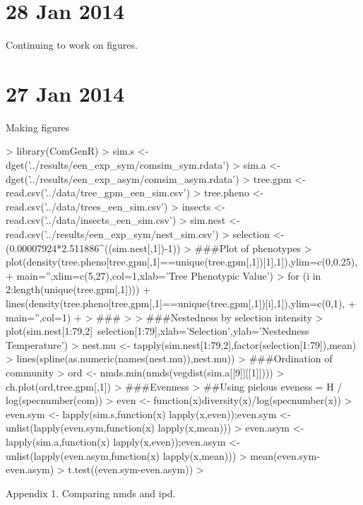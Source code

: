 \documentclass[12pt]{article}
\begin{document}
\section{28 Jan 2014}

Continuing to work on figures.

\section{27 Jan 2014}

Making figures

\begin{Schunk}
\begin{Sinput}
> library(ComGenR)  
> sim.s <- dget('../results/een_exp_sym/comsim_sym.rdata')
> sim.a <- dget('../results/een_exp_asym/comsim_asym.rdata')
> tree.gpm <- read.csv('../data/tree_gpm_een_sim.csv')
> tree.pheno <- read.csv('../data/trees_een_sim.csv')
> insects <- read.csv('../data/insects_een_sim.csv')
> sim.nest <- read.csv('../results/een_exp_sym/nest_sim.csv')
> selection <- (0.00007924*2.511886^((sim.nest[,1])-1))
> ###Plot of phenotypes
> plot(density(tree.pheno[tree.gpm[,1]==unique(tree.gpm[,1])[1],1]),ylim=c(0,0.25),
+      main='',xlim=c(5,27),col=1,xlab='Tree Phenotypic Value')
> for (i in 2:length(unique(tree.gpm[,1]))){
+   lines(density(tree.pheno[tree.gpm[,1]==unique(tree.gpm[,1])[i],1]),ylim=c(0,1),
+         main='',col=1)
+ }
> ###
> 
> ###Nestedness by selection intensity
> plot(sim.nest[1:79,2]~selection[1:79],xlab='Selection',ylab='Nestedness Temperature')
> nest.mu <- tapply(sim.nest[1:79,2],factor(selection[1:79]),mean)
> lines(spline(as.numeric(names(nest.mu)),nest.mu))
> ###Ordination of community
> ord <- nmds.min(nmds(vegdist(sim.a[[9]][[1]])))
> ch.plot(ord,tree.gpm[,1])
> ###Evenness
> ##Using pielous eveness = H / log(specnumber(com))
> even <- function(x){diversity(x)/log(specnumber(x))}
> even.sym <- lapply(sim.s,function(x) lapply(x,even));even.sym <- unlist(lapply(even.sym,function(x) lapply(x,mean)))
> even.asym <- lapply(sim.a,function(x) lapply(x,even));even.asym <- unlist(lapply(even.asym,function(x) lapply(x,mean)))
> mean(even.sym-even.asym)
> t.test((even.sym-even.asym))
> 
\end{Sinput}
\end{Schunk}


Appendix 1. Comparing nmds and ipd.
\end{document}
